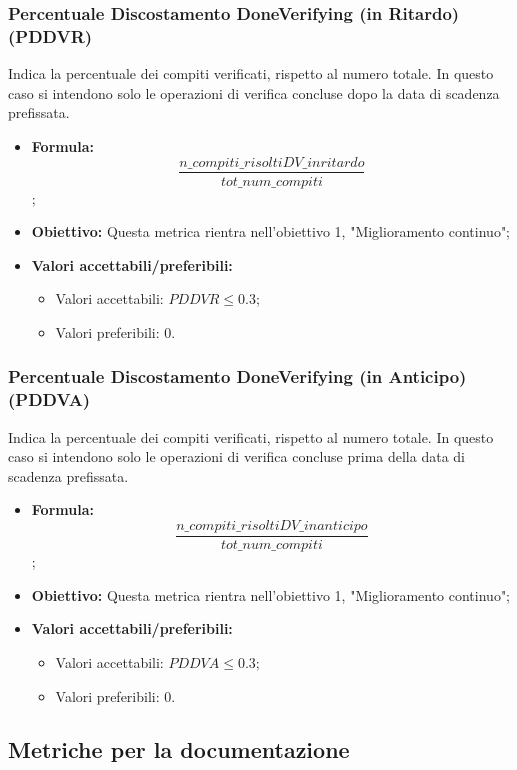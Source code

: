 \subsubsection{Percentuale Discostamento DoneVerifying (in Ritardo) (PDDVR)}
Indica la percentuale dei compiti verificati, rispetto al numero totale. In questo caso si intendono solo le operazioni di verifica concluse dopo la data di scadenza prefissata.
\begin{itemize}
	\item \textbf{Formula:}\[\frac{n\_compiti\_risoltiDV\_inritardo}{tot\_num\_compiti}\];
	\item \textbf{Obiettivo:} Questa metrica rientra nell'obiettivo 1, "Miglioramento continuo";
	\item \textbf{Valori accettabili/preferibili: }
	\begin{itemize}
		\item Valori accettabili: $PDDVR \leq 0.3$;
		\item Valori preferibili: $0$.
	\end{itemize}
\end{itemize}

\subsubsection{Percentuale Discostamento DoneVerifying (in Anticipo) (PDDVA)}
Indica la percentuale dei compiti verificati, rispetto al numero totale. In questo caso si intendono solo le operazioni di verifica concluse prima della data di scadenza prefissata.
\begin{itemize}
	\item \textbf{Formula:}\[\frac{n\_compiti\_risoltiDV\_inanticipo}{tot\_num\_compiti}\];
	\item \textbf{Obiettivo:} Questa metrica rientra nell'obiettivo 1, "Miglioramento continuo";
	\item \textbf{Valori accettabili/preferibili: }
	\begin{itemize}
		\item Valori accettabili: $PDDVA \leq 0.3$;
		\item Valori preferibili: $0$.
	\end{itemize}
\end{itemize}

\subsection{Metriche per la documentazione}


